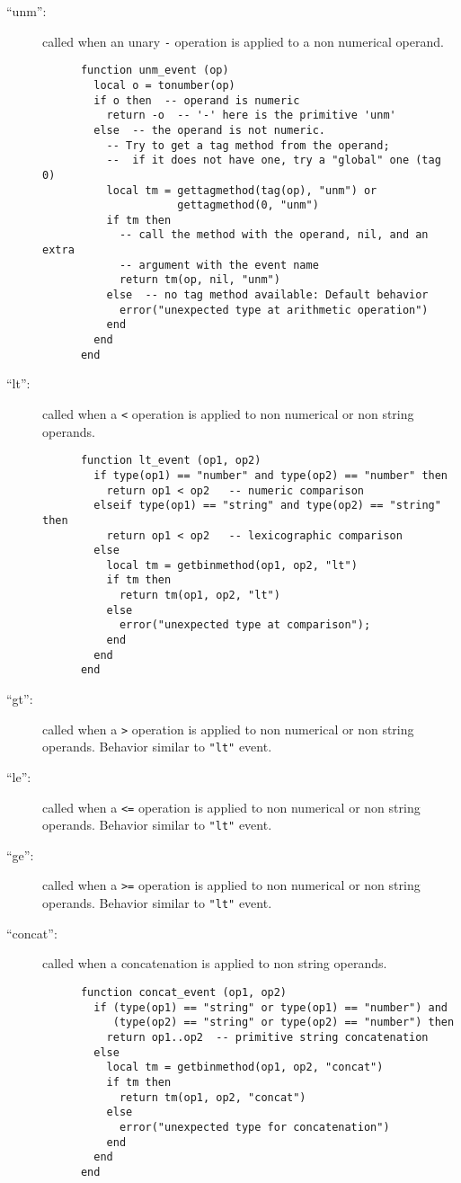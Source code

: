 \begin{description}
\item[``unm'':]
called when an unary \verb|-| operation is applied to a non numerical operand.
\begin{verbatim}
      function unm_event (op)
        local o = tonumber(op)
        if o then  -- operand is numeric
          return -o  -- '-' here is the primitive 'unm'
        else  -- the operand is not numeric.
          -- Try to get a tag method from the operand;
          --  if it does not have one, try a "global" one (tag 0)
          local tm = gettagmethod(tag(op), "unm") or
                     gettagmethod(0, "unm")
          if tm then
            -- call the method with the operand, nil, and an extra
            -- argument with the event name
            return tm(op, nil, "unm")
          else  -- no tag method available: Default behavior
            error("unexpected type at arithmetic operation")
          end
        end
      end
\end{verbatim}

\item[``lt'':]
called when a \verb|<| operation is applied to non numerical
or non string operands.
\begin{verbatim}
      function lt_event (op1, op2)
        if type(op1) == "number" and type(op2) == "number" then
          return op1 < op2   -- numeric comparison
        elseif type(op1) == "string" and type(op2) == "string" then
          return op1 < op2   -- lexicographic comparison
        else
          local tm = getbinmethod(op1, op2, "lt")
          if tm then
            return tm(op1, op2, "lt")
          else
            error("unexpected type at comparison");
          end
        end
      end
\end{verbatim}

\item[``gt'':]
called when a \verb|>| operation is applied to non numerical
or non string operands.
Behavior similar to \verb|"lt"| event.

\item[``le'':]
called when a \verb|<=| operation is applied to non numerical
or non string operands.
Behavior similar to \verb|"lt"| event.

\item[``ge'':]
called when a \verb|>=| operation is applied to non numerical
or non string operands.
Behavior similar to \verb|"lt"| event.

\item[``concat'':]
called when a concatenation is applied to non string operands.
\begin{verbatim}
      function concat_event (op1, op2)
        if (type(op1) == "string" or type(op1) == "number") and
           (type(op2) == "string" or type(op2) == "number") then
          return op1..op2  -- primitive string concatenation
        else
          local tm = getbinmethod(op1, op2, "concat")
          if tm then
            return tm(op1, op2, "concat")
          else
            error("unexpected type for concatenation")
          end
        end
      end
\end{verbatim}


\end{description}

